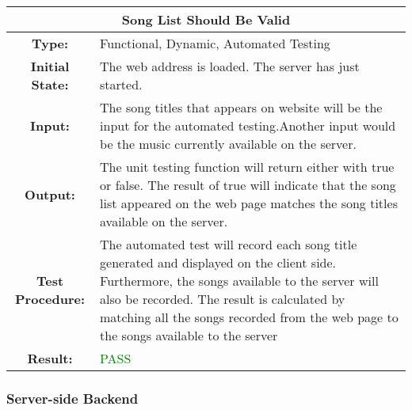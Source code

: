 \documentclass[12pt, titlepage]{article}
\begin{document}
\begin{center}
\begin{table}[H]
\begin{tabularx}{\textwidth}{| c X |}
\hline
\multicolumn{2}{|c|}{\textbf{Song List Should Be Valid}}\\
\hline
\textbf{Type: } & Functional, Dynamic, Automated Testing\\


\textbf{Initial State: } & The web address is loaded. The server has just started.\\


\textbf{Input: } & The song titles that appears on website will be the input for the automated testing.Another input would be the music currently available on the server.\\


\textbf{Output: } & The unit testing function will return either with true or false. The result of true will indicate that the song list appeared on the web page matches the song titles available on the server.\\


\textbf{Test Procedure:  } & The automated test will record each song title generated and displayed on the client side. Furthermore, the songs available to the server will also be recorded. The result is calculated by matching all the songs recorded from the web page to the songs available to the server\\


\textbf{Result: } & \textcolor{green}{PASS}\\
\hline
\end{tabularx}
\end{table}
\end{center}






\subsubsection{Server-side Backend}
\end{document}
